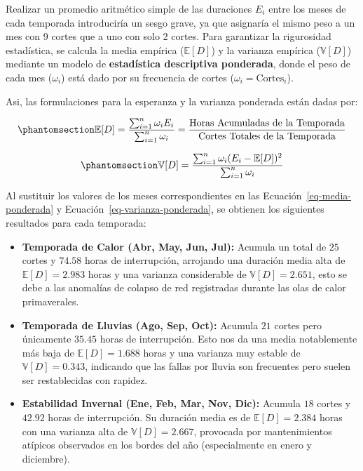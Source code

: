 \documentclass[
  spanish,
  letterpaper,
  DIV=11,
  numbers=noendperiod]{scrreprt}
\providecommand{\tightlist}{%
  \setlength{\itemsep}{0pt}\setlength{\parskip}{0pt}}
\theoremstyle{plain}
\theoremstyle{plain}
\theoremstyle{plain}
\theoremstyle{definition}
\theoremstyle{remark}
\begin{document}
Realizar un promedio aritmético simple de las duraciones \(E_i\) entre
los meses de cada temporada introduciría un sesgo grave, ya que
asignaría el mismo peso a un mes con 9 cortes que a uno con solo 2
cortes. Para garantizar la rigurosidad estadística, se calcula la media
empírica (\(\mathbb{E}[D]\)) y la varianza empírica (\(\mathbb{V}[D]\))
mediante un modelo de \textbf{estadística descriptiva ponderada}, donde
el peso de cada mes (\(\omega_i\)) está dado por su frecuencia de cortes
(\(\omega_i = \text{Cortes}_i\)).

Asi, las formulaciones para la esperanza y la varianza ponderada están
dadas por:

\begin{equation}\phantomsection\label{eq-media-ponderada}{
\mathbb{E}[D] = \frac{\sum_{i=1}^{n} \omega_i E_i}{\sum_{i=1}^{n} \omega_i} = \frac{\text{Horas Acumuladas de la Temporada}}{\text{Cortes Totales de la Temporada}}
}\end{equation}

\begin{equation}\phantomsection\label{eq-varianza-ponderada}{
\mathbb{V}[D] = \frac{\sum_{i=1}^{n} \omega_i (E_i - \mathbb{E}[D])^2}{\sum_{i=1}^{n} \omega_i}
}\end{equation}

Al sustituir los valores de los meses correspondientes en las
Ecuación~\ref{eq-media-ponderada} y
Ecuación~\ref{eq-varianza-ponderada}, se obtienen los siguientes
resultados para cada temporada:

\begin{itemize}
\tightlist
\item
  \textbf{Temporada de Calor (Abr, May, Jun, Jul):} Acumula un total de
  \(25\) cortes y \(74.58\) horas de interrupción, arrojando una
  duración media alta de \(\mathbb{E}[D] = 2.983\) horas y una varianza
  considerable de \(\mathbb{V}[D] = 2.651\), esto se debe a las
  anomalías de colapso de red registradas durante las olas de calor
  primaverales.
\item
  \textbf{Temporada de Lluvias (Ago, Sep, Oct):} Acumula \(21\) cortes
  pero únicamente \(35.45\) horas de interrupción. Esto nos da una media
  notablemente más baja de \(\mathbb{E}[D] = 1.688\) horas y una
  varianza muy estable de \(\mathbb{V}[D] = 0.343\), indicando que las
  fallas por lluvia son frecuentes pero suelen ser restablecidas con
  rapidez.
\item
  \textbf{Estabilidad Invernal (Ene, Feb, Mar, Nov, Dic):} Acumula
  \(18\) cortes y \(42.92\) horas de interrupción. Su duración media es
  de \(\mathbb{E}[D] = 2.384\) horas con una varianza alta de
  \(\mathbb{V}[D] = 2.667\), provocada por mantenimientos atípicos
  observados en los bordes del año (especialmente en enero y diciembre).
\end{itemize}
\end{document}
